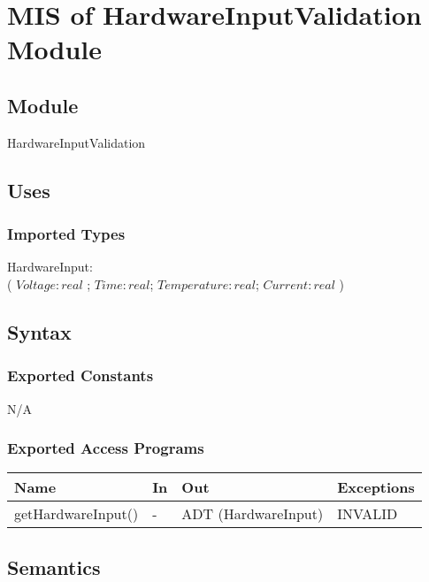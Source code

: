 \documentclass[12pt, titlepage]{article}
\begin{document}
\section{MIS of HardwareInputValidation Module} \label{Module} 


\subsection{Module}

HardwareInputValidation

\subsection{Uses}

\subsubsection{Imported Types}
HardwareInput: \\
( $Voltage: real $ ; $Time: real$; $Temperature: real$; $Current: real$ )

\subsection{Syntax}

\subsubsection{Exported Constants}
N/A

\subsubsection{Exported Access Programs}

\begin{center}
\begin{tabular}{p{4cm} p{2cm} p{6cm} p{2cm}}
\hline
\textbf{Name} & \textbf{In} & \textbf{Out} & \textbf{Exceptions} \\
\hline
getHardwareInput() & - & ADT (HardwareInput) & INVALID \\
\hline
\end{tabular}
\end{center}

\subsection{Semantics}
\end{document}
